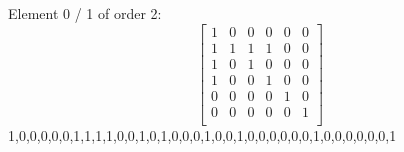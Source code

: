 Element     0 / 1 of order 2:
$$
\left[
\begin{array}{*{6}{r}}
1 & 0 & 0 & 0 & 0 & 0\\
1 & 1 & 1 & 1 & 0 & 0\\
1 & 0 & 1 & 0 & 0 & 0\\
1 & 0 & 0 & 1 & 0 & 0\\
0 & 0 & 0 & 0 & 1 & 0\\
0 & 0 & 0 & 0 & 0 & 1\\
\end{array}
\right]
$$
1,0,0,0,0,0,1,1,1,1,0,0,1,0,1,0,0,0,1,0,0,1,0,0,0,0,0,0,1,0,0,0,0,0,0,1\\
